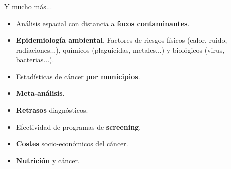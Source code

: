 \documentclass{beamer}
\begin{document}

\begin{frame}\frametitle{}
	
	\begin{block}{Y mucho más...}
		\begin{itemize}
			\item Análisis espacial con distancia a \textbf{focos contaminantes}.
			\item \textbf{Epidemiología ambiental}. Factores de riesgos físicos (calor, ruido, radiaciones...), químicos (plaguicidas, metales...) y biológicos (virus, bacterias...).
			\item Estadísticas de cáncer \textbf{por municipios}.
			\item \textbf{Meta-análisis}.
			\item \textbf{Retrasos} diagnósticos.
			\item Efectividad de programas de \textbf{screening}.
			\item \textbf{Costes} socio-económicos del cáncer.
			\item \textbf{Nutrición} y cáncer.
		\end{itemize}
	\end{block}

\end{frame}
\end{document}
